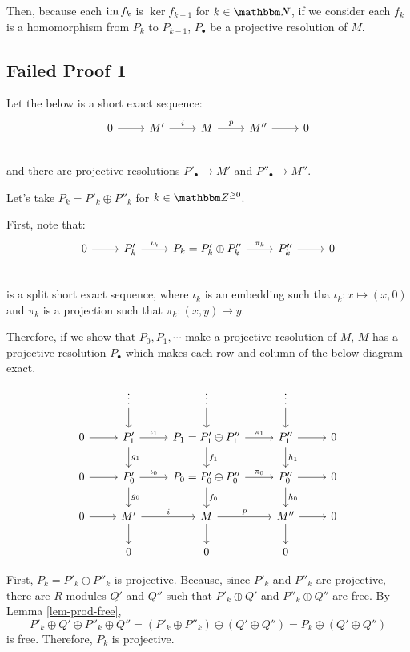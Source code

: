 Then, because each \(\textnormal{im}\, f_k\) is \(\ker f_{k - 1}\) for \(k \in \bbN\), if we consider each \(f_k\) is a homomorphism from \(P_k\) to \(P_{k - 1}\), \(P_\bullet\) be a projective resolution of \(M\).
\qedsq

\subsection*{Failed Proof 1}

Let the below is a short exact sequence:
\[\begin{tikzcd}
  0 \ar{r}
  & M' \ar["i"]{r}
  & M \ar["p"]{r}
  & M'' \ar{r}
  & 0 \\
  \end{tikzcd}\]
and there are projective resolutions \(P'_\bullet \to M'\) and \(P''_\bullet \to M''\).

Let's take \(P_k = P'_k \oplus P''_k\) for \(k \in \bbZ^{\ge 0}\).

First, note that:
\[\begin{tikzcd}
  0 \ar{r}
  & P'_k \ar["\iota_k"]{r}
  & P_k = P'_k \oplus P''_k \ar["\pi_k"]{r}
  & P''_k \ar{r}
  & 0 \\
  \end{tikzcd}\]
is a split short exact sequence, where \(\iota_k\) is an embedding such tha \(\iota_k: x \mapsto (x, 0)\) and \(\pi_k\) is a projection such that \(\pi_k: (x, y) \mapsto y\).

Therefore, if we show that \(P_0, P_1, \cdots\) make a projective resolution of \(M\), \(M\) has a projective resolution \(P_\bullet\) which makes each row and column of the below diagram exact.
\[
\begin{tikzcd}
 & \vdots \ar{d} & \vdots \ar{d} & \vdots \ar{d} & \\
0 \ar{r} & P'_1 \ar["\iota_1"]{r} \ar["g_1"]{d} & P_1 = P'_1 \oplus P''_1 \ar["\pi_1"]{r} \ar["f_1"]{d} & P''_1 \ar{r} \ar["h_1"]{d} & 0 \\
0 \ar{r} & P'_0 \ar["\iota_0"]{r} \ar["g_0"]{d} & P_0 = P'_0 \oplus P''_0 \ar["\pi_0"]{r} \ar["f_0"]{d} & P''_0 \ar{r} \ar["h_0"]{d} & 0 \\
0 \ar{r} & M' \ar["i"]{r} \ar{d} & M \ar["p"]{r} \ar{d} & M'' \ar{r} \ar{d} & 0 \\
& 0 & 0 & 0 &
\end{tikzcd}
\]

\br
First, \(P_k = P'_k \oplus P''_k\) is projective.
Because, since \(P'_k\) and \(P''_k\) are projective, there are \(R\)-modules \(Q'\) and \(Q''\) such that \(P'_k \oplus Q'\) and \(P''_k \oplus Q''\) are free.
By Lemma \ref{lem-prod-free},
\[P'_k \oplus Q' \oplus P''_k \oplus Q''
  = (P'_k \oplus P''_k) \oplus (Q' \oplus Q'')
  = P_k \oplus (Q' \oplus Q'')\]
is free.
Therefore, \(P_k\) is projective.

